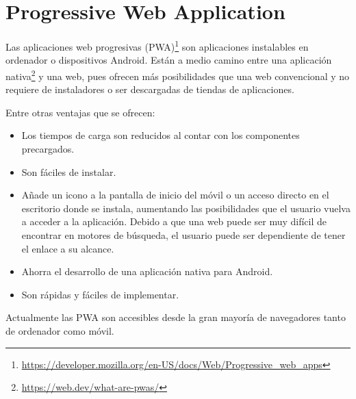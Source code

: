 \section{Progressive Web Application}
\label{cap3:sec:pwa}

Las aplicaciones web progresivas (PWA)\footnote{\url{https://developer.mozilla.org/en-US/docs/Web/Progressive_web_apps}} son aplicaciones instalables en ordenador o dispositivos Android. Están a medio camino entre una aplicación nativa\footnote{\url{https://web.dev/what-are-pwas/}}  y una web, pues ofrecen más posibilidades que una web convencional y no requiere de instaladores o ser descargadas de tiendas de aplicaciones.
    
Entre otras ventajas que se ofrecen:

\begin{itemize}
	\item Los tiempos de carga son reducidos al contar con los componentes precargados.
	
	
	\item Son fáciles de instalar.
	
	\item Añade un icono a la pantalla de inicio del móvil o un acceso directo en el escritorio donde se instala, aumentando las posibilidades que el usuario vuelva a acceder a la aplicación. Debido a que una web puede ser muy difícil de encontrar en motores de búsqueda, el usuario puede ser dependiente de tener el enlace a su alcance.
	
	\item Ahorra el desarrollo de una aplicación nativa para Android. 
	
	\item Son rápidas y fáciles de implementar.
	
\end{itemize}

Actualmente las PWA son accesibles desde la gran mayoría de navegadores tanto de ordenador como móvil.






